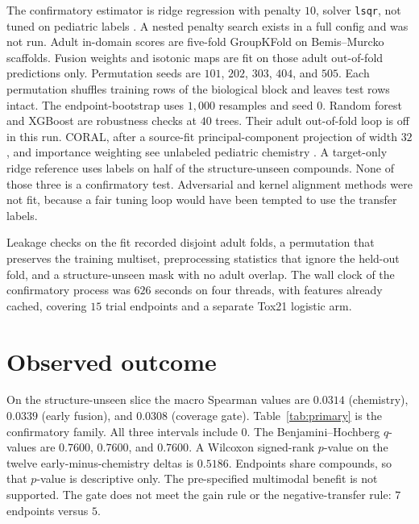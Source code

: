\documentclass{article}
\begin{document}
The confirmatory estimator is ridge regression with penalty $10$, solver \texttt{lsqr}, not tuned on pediatric labels \citep{hoerl1970ridge}.
A nested penalty search exists in a full config and was not run.
Adult in-domain scores are five-fold GroupKFold on Bemis--Murcko scaffolds.
Fusion weights and isotonic maps are fit on those adult out-of-fold predictions only.
Permutation seeds are $101$, $202$, $303$, $404$, and $505$.
Each permutation shuffles training rows of the biological block and leaves test rows intact.
The endpoint-bootstrap uses $1{,}000$ resamples and seed $0$.
Random forest and XGBoost are robustness checks at $40$ trees.
Their adult out-of-fold loop is off in this run.
CORAL, after a source-fit principal-component projection of width $32$, and importance weighting see unlabeled pediatric chemistry \citep{sun2016coral}.
A target-only ridge reference uses labels on half of the structure-unseen compounds.
None of those three is a confirmatory test.
Adversarial and kernel alignment methods were not fit, because a fair tuning loop would have been tempted to use the transfer labels.

Leakage checks on the fit recorded disjoint adult folds, a permutation that preserves the training multiset, preprocessing statistics that ignore the held-out fold, and a structure-unseen mask with no adult overlap.
The wall clock of the confirmatory process was $626$ seconds on four threads, with features already cached, covering $15$ trial endpoints and a separate Tox21 logistic arm.

\section{Observed outcome}
\label{sec:results}

On the structure-unseen slice the macro Spearman values are $0.0314$ (chemistry), $0.0339$ (early fusion), and $0.0308$ (coverage gate).
Table~\ref{tab:primary} is the confirmatory family.
All three intervals include $0$.
The Benjamini--Hochberg $q$-values are $0.7600$, $0.7600$, and $0.7600$.
A Wilcoxon signed-rank $p$-value on the twelve early-minus-chemistry deltas is $0.5186$.
Endpoints share compounds, so that $p$-value is descriptive only.
The pre-specified multimodal benefit is not supported.
The gate does not meet the gain rule or the negative-transfer rule: $7$ endpoints versus $5$.
\end{document}
